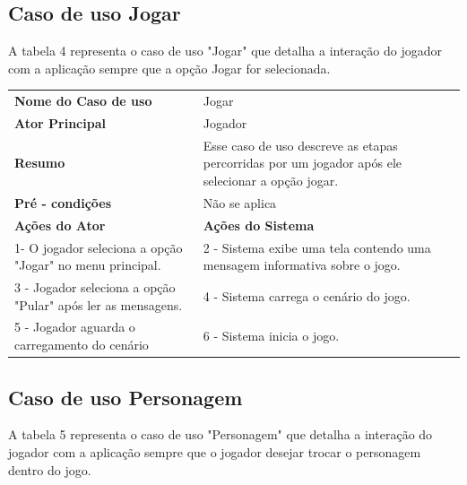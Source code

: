 \subsection{Caso de uso Jogar}
A tabela 4 representa o caso de uso "Jogar" que detalha a interação do jogador com a aplicação sempre que a opção Jogar for selecionada.

\begin{table} [h!]
\centering 
{} 
\begin{tabular}{ | m{5cm} | m{8cm}| }  
\hline 
\textbf {Nome do Caso de uso} & Jogar \\ 
\textbf {Ator Principal} & Jogador \\  
\textbf {Resumo} & Esse caso de uso descreve as etapas percorridas por um jogador após ele selecionar a opção jogar. \\ 
\textbf {Pré - condições} & Não se aplica\\ 
\hline 
\textbf {Ações do Ator} & \textbf {Ações do Sistema}\\ 
\hline 
1- O jogador seleciona a opção "Jogar" no menu principal. & 2 - Sistema exibe uma tela contendo uma mensagem informativa sobre o jogo.\\ 
3 - Jogador seleciona a opção "Pular" após ler as mensagens. & 4 - Sistema carrega o cenário do jogo.\\
5 - Jogador aguarda o carregamento do cenário & 6 - Sistema inicia o jogo.\\
\hline 
\end{tabular} 
\end{table}

\subsection{Caso de uso Personagem} 
A tabela 5 representa o caso de uso "Personagem" que detalha a interação do jogador com a aplicação sempre que o jogador desejar trocar o personagem dentro do jogo.

